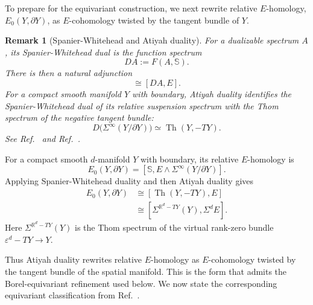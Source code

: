 \documentclass[aps,prx,reprint,superscriptaddress,twocolumn,amsmath,amssymb,amsfonts, nofootinbib]{revtex4-2}
\theoremstyle{apsstyle}
\newtheorem{remark}[theorem]{Remark}
\begin{document}
\bigskip 

To prepare for the equivariant construction, we next rewrite relative $E$-homology, $E_{0}(Y, \partial Y)$, as $E$-cohomology twisted by the tangent bundle of $Y$.

\begin{remark}[Spanier-Whitehead and Atiyah duality]
\label{rem:Spanier_Whitehead_Atiyah_duality}
For a dualizable spectrum $A$, its Spanier-Whitehead dual is the
function spectrum
\begin{equation*}
    DA
    :=
    F(A,\mathbb S).
\end{equation*}
There is then a natural adjunction
\begin{equation}
    [\mathbb S,
        E\wedge A]
    \cong
    [DA, E].
    \label{eq:Spanier_Whitehead_duality_adjunction}
\end{equation}
For a compact smooth manifold $Y$ with boundary, Atiyah duality
identifies the Spanier-Whitehead dual of its relative suspension
spectrum with the Thom spectrum of the negative tangent bundle:
\begin{equation}
    D\bigl(\Sigma^\infty(Y/\partial Y)\bigr)
    \simeq
    \operatorname{Th}(Y,-TY).
    \label{eq:Atiyah_duality_relative}
\end{equation}
See Ref.~\cite{AtiyahThomComplexes} and
Ref.~\cite[Remark~2.6]{Freed2021}.
\end{remark}

\bigskip 

\noindent For a compact smooth $d$-manifold $Y$ with boundary, its relative
$E$-homology is
\begin{equation*}
    E_0(Y,\partial Y)
    =
    [\mathbb S, E\wedge\Sigma^\infty(Y/\partial Y)].
\end{equation*}
Applying Spanier-Whitehead duality and then Atiyah duality gives
\begin{equation}
\begin{aligned}
    E_0(Y,\partial Y)
    &\cong [\operatorname{Th}(Y,-TY),
        E]\\
    &\cong [\Sigma^{\mathbb R^d-TY}(Y),
        \Sigma^dE].
\end{aligned}
\label{eq:relative_homology_twisted_cohomology}
\end{equation}
Here $\Sigma^{\mathbb R^d-TY}(Y)$ is the Thom spectrum of the
virtual rank-zero bundle $\varepsilon^d-TY\to Y$.

\noindent Thus Atiyah duality rewrites relative $E$-homology as
$E$-cohomology twisted by the tangent bundle of the spatial manifold.
This is the form that admits the Borel-equivariant refinement used
below. We now state the corresponding equivariant classification from
Ref.~\cite{Freed2021}.
\end{document}

